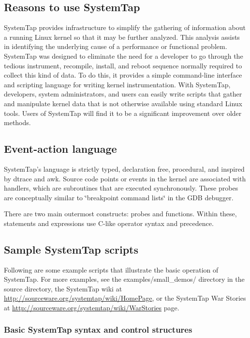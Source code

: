 \documentclass[twoside,english]{article}
\begin{document}
\subsection{Reasons to use SystemTap}

SystemTap provides infrastructure to simplify the gathering of information
about a running Linux kernel so that it may be further analyzed. This analysis
assists in identifying the underlying cause of a performance or functional
problem. SystemTap was designed to eliminate the need for a developer to
go through the tedious instrument, recompile, install, and reboot sequence
normally required to collect this kind of data. To do this, it provides a
simple command-line interface and scripting language for writing kernel instrumentation.
With SystemTap, developers, system administrators, and users can easily write
scripts that gather and manipulate kernel data that is not otherwise available
using standard Linux tools. Users of SystemTap will find it to be a significant
improvement over older methods.

\subsection{Event-action language}
SystemTap's language is strictly typed, declaration free, procedural, and
inspired by dtrace and awk. Source code points or events in the kernel are
associated with handlers, which are subroutines that are executed synchronously.
These probes are conceptually similar to \char`\"{}breakpoint command lists\char`\"{}
in the GDB debugger.

There are two main outermost constructs: probes and functions. Within these,
statements and expressions use C-like operator syntax and precedence.

\subsection{Sample SystemTap scripts}
Following are some example scripts that illustrate the basic operation of
SystemTap. For more examples, see the examples/small\_demos/ directory in
the source directory, the SystemTap wiki at \url{http://sourceware.org/systemtap/wiki/HomePage},
or the SystemTap War Stories at \url{http://sourceware.org/systemtap/wiki/WarStories} page.

\subsubsection{Basic SystemTap syntax and control structures}
\end{document}
